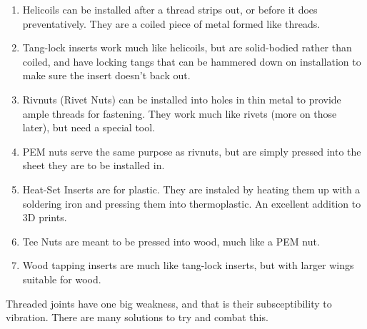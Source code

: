 \documentclass[10pt,letterpaper]{book}
\begin{document}
	\begin{enumerate}[label=\alph*]
		\item Helicoils can be installed after a thread strips out, or before it does preventatively. They are a coiled piece of metal formed like threads.
		\item Tang-lock inserts work much like helicoils, but are solid-bodied rather than coiled, and have locking tangs that can be hammered down on installation to make sure the insert doesn't back out.
		\item Rivnuts (Rivet Nuts) can be installed into holes in thin metal to provide ample threads for fastening. They work much like rivets (more on those later), but need a special tool.
		\item PEM nuts serve the same purpose as rivnuts, but are simply pressed into the sheet they are to be installed in.
		\item Heat-Set Inserts are for plastic. They are instaled by heating them up with a soldering iron and pressing them into thermoplastic. An excellent addition to 3D prints.
		\item Tee Nuts are meant to be pressed into wood, much like a PEM nut.
		\item Wood tapping inserts are much like tang-lock inserts, but with larger wings suitable for wood.
	\end{enumerate}
	
	Threaded joints have one big weakness, and that is their subsceptibility to vibration. There are many solutions to try and combat this.
	
\end{document}
